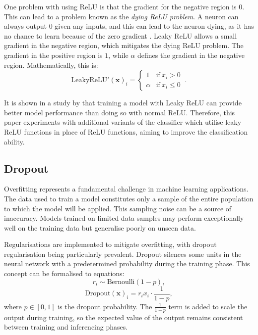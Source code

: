 \documentclass{l4proj}
\begin{document}
One problem with using ReLU is that the gradient for the negative region is $0$. This can lead to a problem known as the \emph{dying ReLU problem}. A neuron can always output $0$ given any inputs, and this can lead to the neuron dying, as it has no chance to learn because of the zero gradient \citep{Lu2020}. Leaky ReLU allows a small gradient in the negative region, which mitigates the dying ReLU problem. The gradient in the positive region is $1$, while $\alpha$ defines the gradient in the negative region. Mathematically, this is:
\begin{equation}
    \text{LeakyReLU}'(\boldsymbol{x})_i = 
    \begin{cases}
        1 & \text{if} \ x_i > 0 \\
        \alpha & \text{if} \ x_i \leq 0
    \end{cases} \ .
\end{equation}

It is shown in a study by \cite{xu2015} that training a model with Leaky ReLU can provide better model performance than doing so with normal ReLU. Therefore, this paper experiments with additional variants of the classifier which utilise leaky ReLU functions in place of ReLU functions, aiming to improve the classification ability.

\subsection{Dropout} \label{sec:dropout}
Overfitting represents a fundamental challenge in machine learning applications. The data used to train a model constitutes only a sample of the entire population to which the model will be applied. This sampling noise can be a source of inaccuracy. Models trained on limited data samples may perform exceptionally well on the training data but generalise poorly on unseen data.

Regularisations are implemented to mitigate overfitting,  with dropout regularisation being particularly prevalent. Dropout silences some units in the neural network with a predetermined probability during the training phase. This concept can be formalised to equations:
\begin{equation}
    r_i \sim \text{Bernoulli}(1-p),
\end{equation}
\begin{equation}
    \text{Dropout}(\boldsymbol{x})_i = r_ix_i \cdot \frac{1}{1-p},
\end{equation}
where $p \in [0,1]$ is the dropout probability. The $\frac{1}{1-p}$ term is added to scale the output during training, so the expected value of the output remains consistent between training and inferencing phases. 
\end{document}

